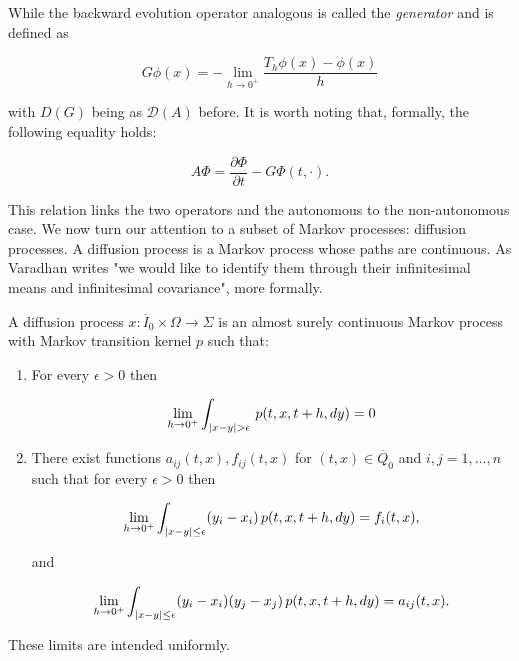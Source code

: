 While the backward evolution operator analogous is called the \textit{generator} and is defined as

\begin{equation}
    G\phi(x) = - \lim_{h\to0^+} \frac{T_h\phi(x) - \phi(x)}{h}
\end{equation}

with $D(G)$ being as $\mathcal{D}(A)$ before. It is worth noting that, formally, the following equality holds:

\begin{equation}
    A\Phi = \frac{\partial \Phi}{\partial t} - G\Phi(t,\cdot).
\end{equation}

This relation links the two operators and the autonomous to the non-autonomous case. We now turn our attention to 
a subset of Markov processes: diffusion processes. A diffusion process is a Markov process whose paths are continuous. As Varadhan writes \cite{Varadhan} "we would like to identify them through their infinitesimal means and infinitesimal covariance", more formally. 

\begin{definition}
    A diffusion process $x:\overline{I}_0\times\Omega\rightarrow\Sigma$ is an almost surely continuous Markov process with Markov transition kernel $p$ such that:

    \begin{enumerate}
        \item For every $\epsilon>0$ then
        
        \begin{equation}
            \lim_{h\to0^+} \int_{\abs{x-y}>\epsilon} \,p(t,x,t+h,dy) = 0
        \end{equation}

        \item There exist functions $a_{ij}(t,x),f_{ij}(t,x)$ for $(t,x)\in\overline{Q}_0$ and $i,j=1,\dots,n$ such that for every $\epsilon>0$ then
        
        \begin{equation}
            \lim_{h\to0^+} \int_{\abs{x-y}\leq\epsilon} (y_i-x_i)\,p(t,x,t+h,dy) = f_i(t,x),
        \end{equation}

        and

        \begin{equation}
            \lim_{h\to0^+} \int_{\abs{x-y}\leq\epsilon} (y_i-x_i)(y_j-x_j)\,p(t,x,t+h,dy) = a_{ij}(t,x).
        \end{equation}
    \end{enumerate}

    These limits are intended uniformly.
\end{definition}

